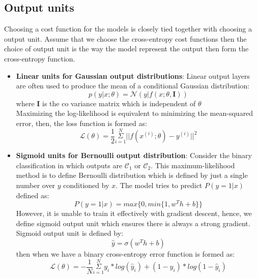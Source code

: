 \subsection{Output units}
\label{subsection:output_units}
\hspace{0.45cm}Choosing a cost function for the models is closely tied together with choosing a output unit. 
Assume that we choose the cross-entropy cost functions then the choice of output unit is the way the model represent 
the output then form the cross-entropy function.\par
\begin{itemize}
    \item \textbf{Linear units for Gaussian output distributions}: Linear output layers are often used to produce the mean of a conditional Gaussian distribution:
    \begin{equation}
        p(y|x;\theta) = \mathcal{N}(y|f(x;\theta, \mathbf{I}))
    \end{equation}
    where $\mathbf{I}$ is the co variance matrix which is independent of $\theta$\\
    Maximizing the log-likelihood is equivalent to minimizing the mean-squared error, then, the loss function is formed as:
    \begin{equation}
        \mathcal{L}(\theta) = \frac{1}{2}\underset{i=1}{\overset{N}{\Sigma}}||f(x^{(i)};\theta) - y^{(i)}||^2
    \end{equation}
    \item \textbf{Sigmoid units for Bernoulli output distribution}: Consider the binary classification in which outputs are $\mathcal{C}_1$ or $\mathcal{C}_2$.
    This maximum-likelihood method is to define Bernoulli distribution which is defined by just a single number over $y$ conditioned by $x$\cite{Goodfellow-et-al-2016}. The model tries to predict $P(y=1|x)$ defined as:
    \begin{equation}
        P(y=1|x) = max\{0, min\{1, w^Th+b\}\}
    \end{equation}
    However, it is unable to train it effectively with gradient descent, hence, we define sigmoid output unit which ensures there is always a strong gradient\cite{Goodfellow-et-al-2016}. Sigmoid output unit is defined by:
    \begin{equation}
        \hat{y} = \sigma(w^Th + b)
    \end{equation}
    then when we have a binary cross-entropy error function is formed as:
    \begin{equation}
        \mathcal{L}(\theta) = -\frac{1}{N}\underset{i=1}{\overset{N}{\Sigma}}y_i*log(\hat{y}_i) + (1-y_i)*log(1-\hat{y}_i)

\end{equation}
\end{itemize}
